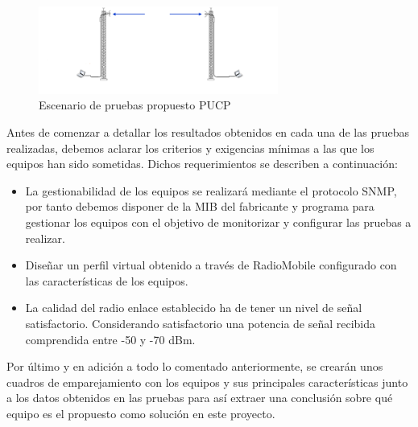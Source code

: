 \begin{figure}[H]
			\centering
			\includegraphics[width=0.7\textwidth]{img/escenario_pruebas.png}
			\caption{Escenario de pruebas propuesto PUCP}
			\label{pruebasPUCP}
\end{figure}

Antes de comenzar a detallar los resultados obtenidos en cada una de las pruebas realizadas, debemos aclarar los criterios y exigencias mínimas a las que los equipos han sido sometidas. Dichos requerimientos se describen a continuación:

\begin{itemize}
    \item La gestionabilidad de los equipos se realizará mediante el protocolo SNMP, por tanto debemos disponer de la MIB del fabricante y programa para gestionar los equipos con el objetivo de monitorizar y configurar las pruebas a realizar.
    \item Diseñar un perfil virtual obtenido a través de RadioMobile configurado con las características de los equipos.
    \item La calidad del radio enlace establecido ha de tener un nivel de señal satisfactorio. Considerando satisfactorio una potencia de señal recibida comprendida entre -50 y -70 dBm.
\end{itemize}

Por último y en adición a todo lo comentado anteriormente, se crearán unos cuadros de emparejamiento con los equipos y sus principales características junto a los datos obtenidos en las pruebas para así extraer una conclusión sobre qué equipo es el propuesto como solución en este proyecto.

